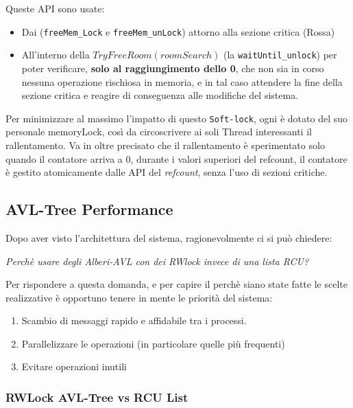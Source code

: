 Queste API sono usate:
\begin{itemize}
\item
Dai \Reader (\verb|freeMem_Lock| e \verb|freeMem_unLock|) attorno alla sezione critica ({\color{red}Rossa})

\item
All'interno della {\color{blue}$TryFreeRoom(roomSearch)$} (la \verb|waitUntil_unlock|) per poter verificare,
\textbf{solo al raggiungimento dello 0}, che non sia in corso nessuna operazione rischiosa in memoria, e in tal caso
attendere la fine della sezione critica e reagire di conseguenza alle modifiche del sistema.
\end{itemize}

Per minimizzare al massimo l'impatto di questo \texttt{Soft-lock}, ogni \Topic è dotato del suo personale memoryLock,
così da circoscrivere ai soli Thread interessanti il rallentamento. Va in oltre precisato che il rallentamento è
sperimentato solo quando il contatore arriva a 0, durante i valori superiori del refcount, il contatore è gestito
atomicamente dalle API del \textit{refcount}, senza l'uso di sezioni critiche.


\subsection{AVL-Tree Performance} \label{treePerf}
Dopo aver visto l'architettura del sistema, ragionevolmente ci si può chiedere:

\begin{center}
\textit{Perchè usare degli Alberi-AVL con dei RWlock invece di una lista RCU?}
\end{center}

Per rispondere a questa domanda, e per capire il perchè siano state fatte le scelte realizzative è opportuno tenere in
mente le priorità del sistema:

\begin{enumerate}
 \item Scambio di messaggi rapido e affidabile tra i processi.
 \item Parallelizzare le operazioni (in particolare quelle più frequenti)
 \item Evitare operazioni inutili
\end{enumerate}

\subsubsection{RWLock AVL-Tree vs RCU List} \label{AVL_Vs_RCUList}

